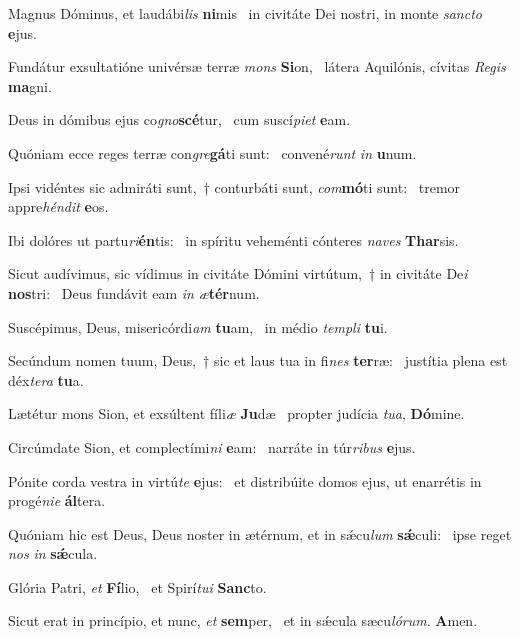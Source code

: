 \item Magnus Dóminus, et laudábi\textit{lis} \textbf{ni}mis~\psstar{} in civitáte Dei nostri, in monte \textit{sancto} \textbf{e}jus.
\item Fundátur exsultatióne univérsæ terræ \textit{mons} \textbf{Si}on,~\psstar{} látera Aquilónis, cívitas \textit{Regis} \textbf{ma}gni.
\item Deus in dómibus ejus co\textit{gno}\textbf{scé}tur,~\psstar{} cum suscí\textit{piet} \textbf{e}am.
\item Quóniam ecce reges terræ con\textit{gre}\textbf{gá}ti sunt:~\psstar{} convené\textit{runt} \textit{in} \textbf{u}num.
\item Ipsi vidéntes sic admiráti sunt,~† conturbáti sunt, \textit{com}\textbf{mó}ti sunt:~\psstar{} tremor appre\textit{héndit} \textbf{e}os.
\item Ibi dolóres ut partu\textit{ri}\textbf{én}tis:~\psstar{} in spíritu veheménti cónteres \textit{naves} \textbf{Thar}sis.
\item Sicut audívimus, sic vídimus in civitáte Dómini virtútum,~† in civitáte De\textit{i} \textbf{nos}tri:~\psstar{} Deus fundávit eam \textit{in} \textit{æ}\textbf{tér}num.
\item Suscépimus, Deus, misericórdi\textit{am} \textbf{tu}am,~\psstar{} in médio \textit{templi} \textbf{tu}i.
\item Secúndum nomen tuum, Deus,~† sic et laus tua in fi\textit{nes} \textbf{ter}ræ:~\psstar{} justítia plena est déx\textit{tera} \textbf{tu}a.
\item Lætétur mons Sion, et exsúltent fíli\textit{æ} \textbf{Ju}dæ~\psstar{} propter judícia \textit{tua}, \textbf{Dó}mine.
\item Circúmdate Sion, et complectími\textit{ni} \textbf{e}am:~\psstar{} narráte in túr\textit{ribus} \textbf{e}jus.
\item Pónite corda vestra in virtú\textit{te} \textbf{e}jus:~\psstar{} et distribúite domos ejus, ut enarrétis in progé\textit{nie} \textbf{ál}tera.
\item Quóniam hic est Deus, Deus noster in ætérnum, et in sǽcu\textit{lum} \textbf{sǽ}culi:~\psstar{} ipse reget \textit{nos} \textit{in} \textbf{sǽ}cula.
\item Glória Patri, \textit{et} \textbf{Fí}lio,~\psstar{} et Spirí\textit{tui} \textbf{Sanc}to.
\item Sicut erat in princípio, et nunc, \textit{et} \textbf{sem}per,~\psstar{} et in sǽcula sæcu\textit{lórum}. \textbf{A}men.
